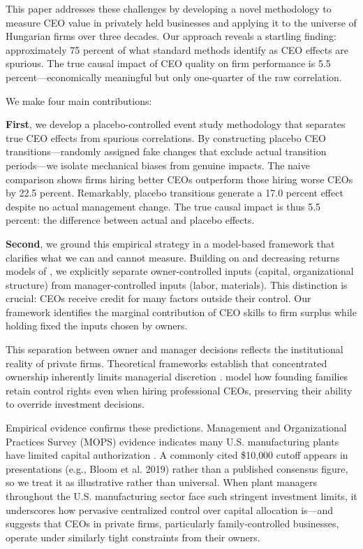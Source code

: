 \documentclass[11pt,a4paper]{article}
\begin{document}
This paper addresses these challenges by developing a novel methodology to measure CEO value in privately held businesses and applying it to the universe of Hungarian firms over three decades. Our approach reveals a startling finding: approximately 75 percent of what standard methods identify as CEO effects are spurious. The true causal impact of CEO quality on firm performance is 5.5 percent---economically meaningful but only one-quarter of the raw correlation.

We make four main contributions:

\textbf{First}, we develop a placebo-controlled event study methodology that separates true CEO effects from spurious correlations. By constructing placebo CEO transitions---randomly assigned fake changes that exclude actual transition periods---we isolate mechanical biases from genuine impacts. The naive comparison shows firms hiring better CEOs outperform those hiring worse CEOs by 22.5 percent. Remarkably, placebo transitions generate a 17.0 percent effect despite no actual management change. The true causal impact is thus 5.5 percent: the difference between actual and placebo effects.

\textbf{Second}, we ground this empirical strategy in a model-based framework that clarifies what we can and cannot measure. Building on \citet{Lucas1978-rp} and decreasing returns models of \citet{AtkesonKehoe2005JPE, McGrattan2012RED}, we explicitly separate owner-controlled inputs (capital, organizational structure) from manager-controlled inputs (labor, materials). This distinction is crucial: CEOs receive credit for many factors outside their control. Our framework identifies the marginal contribution of CEO skills to firm surplus while holding fixed the inputs chosen by owners.

This separation between owner and manager decisions reflects the institutional reality of private firms. Theoretical frameworks establish that concentrated ownership inherently limits managerial discretion \citep{fama1983separation, jensen1976theory}. \citet{burkart2003family} model how founding families retain control rights even when hiring professional CEOs, preserving their ability to override investment decisions. 

Empirical evidence confirms these predictions. Management and Organizational Practices Survey (MOPS) evidence indicates many U.S. manufacturing plants have limited capital authorization \citep{wang2019decentralization, buffington2017mops}. A commonly cited \$10{,}000 cutoff appears in presentations (e.g., Bloom et al. 2019) rather than a published consensus figure, so we treat it as illustrative rather than universal. When plant managers throughout the U.S. manufacturing sector face such stringent investment limits, it underscores how pervasive centralized control over capital allocation is---and suggests that CEOs in private firms, particularly family-controlled businesses, operate under similarly tight constraints from their owners.
\end{document}
